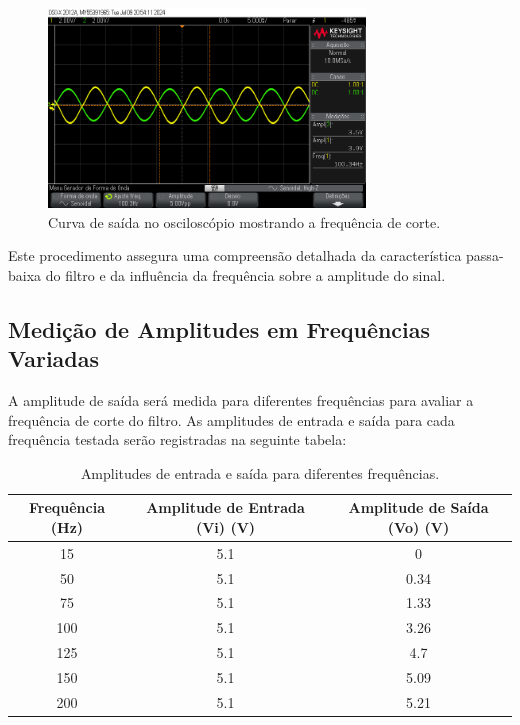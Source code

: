 \documentclass[
	12pt,				%
	openright,			%
	twoside,			%
	a4paper,			%
	english,			%
	french,				%
	spanish,			%
	brazil,				%
	]{abntex2}
\begin{document}
\begin{figure}[H]
    \centering
    \includegraphics[width=0.75\textwidth]{imgs/scope_9.png}
    \caption{Curva de saída no osciloscópio mostrando a frequência de corte.}
    \label{fig:first_oscilloscope_cutoff_frequency}
\end{figure}

Este procedimento assegura uma compreensão detalhada da característica passa-baixa do filtro e da influência da frequência sobre a amplitude do sinal.

\subsection{Medição de Amplitudes em Frequências Variadas}

A amplitude de saída será medida para diferentes frequências para avaliar a frequência de corte do filtro. As amplitudes de entrada e saída para cada frequência testada serão registradas na seguinte tabela:

\begin{table}[H]  
    \scriptsize
    \centering
    \begin{tabular}{|c|c|c|}
        \hline
        Frequência (Hz) & Amplitude de Entrada (Vi) (V) & Amplitude de Saída (Vo) (V) \\
        \hline
        15 & 5.1 & 0 \\
        50 & 5.1 & 0.34 \\
        75 & 5.1 & 1.33 \\
        100 & 5.1 & 3.26 \\
        125 & 5.1 & 4.7 \\
        150 & 5.1 & 5.09 \\
        200 & 5.1 & 5.21 \\
        \hline
    \end{tabular}
    \caption{Amplitudes de entrada e saída para diferentes frequências.}
    \label{tab:frequency_response}
\end{table}
\end{document}
